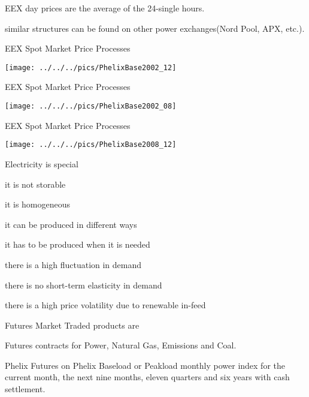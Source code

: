 	EEX day prices are the average of the 24-single hours.

	similar structures can be found on other power exchanges(Nord Pool, APX, etc.).






{EEX Spot Market Price Processes}

\texttt{[image: ../../../pics/PhelixBase2002\_12]}

{EEX Spot Market Price Processes}

\texttt{[image: ../../../pics/PhelixBase2002\_08]}

{EEX Spot Market Price Processes}

\texttt{[image: ../../../pics/PhelixBase2008\_12]}

{Electricity is special}






	it is not storable

	it is homogeneous

	it can be produced in different ways

	it has to be produced when it is needed

	there is a high fluctuation in demand

	there is no short-term elasticity in demand

	there is a high price volatility due to renewable in-feed







{Futures Market} Traded products are






	Futures contracts for Power, Natural Gas, Emissions and Coal.

	Phelix Futures on Phelix Baseload or Peakload monthly power index for the current month, the next nine months, eleven quarters and six years with cash settlement.

